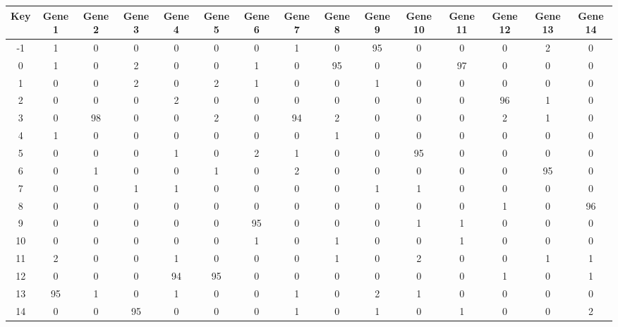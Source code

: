 \begin{tabular}{|c|c|c|c|c|c|c|c|c|c|c|c|c|c|c|}
\hline
Key & Gene 1 & Gene 2 & Gene 3 & Gene 4 & Gene 5 & Gene 6 & Gene 7 & Gene 8 & Gene 9 & Gene 10 & Gene 11 & Gene 12 & Gene 13 & Gene 14 \\
\hline
-1 & 1 & 0 & 0 & 0 & 0 & 0 & 1 & 0 & 95 & 0 & 0 & 0 & 2 & 0 \\
0 & 1 & 0 & 2 & 0 & 0 & 1 & 0 & 95 & 0 & 0 & 97 & 0 & 0 & 0 \\
1 & 0 & 0 & 2 & 0 & 2 & 1 & 0 & 0 & 1 & 0 & 0 & 0 & 0 & 0 \\
2 & 0 & 0 & 0 & 2 & 0 & 0 & 0 & 0 & 0 & 0 & 0 & 96 & 1 & 0 \\
3 & 0 & 98 & 0 & 0 & 2 & 0 & 94 & 2 & 0 & 0 & 0 & 2 & 1 & 0 \\
4 & 1 & 0 & 0 & 0 & 0 & 0 & 0 & 1 & 0 & 0 & 0 & 0 & 0 & 0 \\
5 & 0 & 0 & 0 & 1 & 0 & 2 & 1 & 0 & 0 & 95 & 0 & 0 & 0 & 0 \\
6 & 0 & 1 & 0 & 0 & 1 & 0 & 2 & 0 & 0 & 0 & 0 & 0 & 95 & 0 \\
7 & 0 & 0 & 1 & 1 & 0 & 0 & 0 & 0 & 1 & 1 & 0 & 0 & 0 & 0 \\
8 & 0 & 0 & 0 & 0 & 0 & 0 & 0 & 0 & 0 & 0 & 0 & 1 & 0 & 96 \\
9 & 0 & 0 & 0 & 0 & 0 & 95 & 0 & 0 & 0 & 1 & 1 & 0 & 0 & 0 \\
10 & 0 & 0 & 0 & 0 & 0 & 1 & 0 & 1 & 0 & 0 & 1 & 0 & 0 & 0 \\
11 & 2 & 0 & 0 & 1 & 0 & 0 & 0 & 1 & 0 & 2 & 0 & 0 & 1 & 1 \\
12 & 0 & 0 & 0 & 94 & 95 & 0 & 0 & 0 & 0 & 0 & 0 & 1 & 0 & 1 \\
13 & 95 & 1 & 0 & 1 & 0 & 0 & 1 & 0 & 2 & 1 & 0 & 0 & 0 & 0 \\
14 & 0 & 0 & 95 & 0 & 0 & 0 & 1 & 0 & 1 & 0 & 1 & 0 & 0 & 2 \\
\hline
\end{tabular}